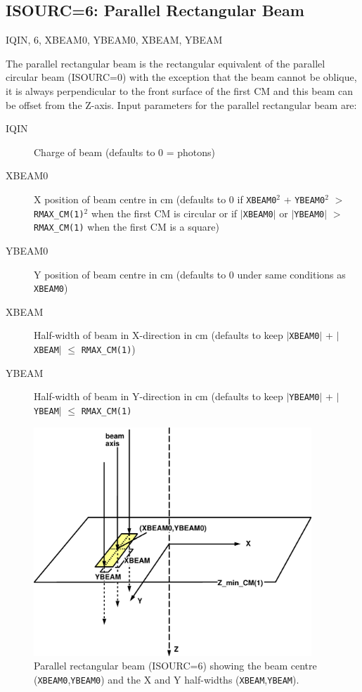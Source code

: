 \documentclass[12pt,twoside]{article}
\newcommand{\cen}[1]{\begin{center} #1 \end{center}                   }
\begin{document}
\clearpage
\subsection{ISOURC=6: Parallel Rectangular Beam}
\cen{IQIN, 6, XBEAM0, YBEAM0, XBEAM, YBEAM}
 
The parallel rectangular beam is the rectangular equivalent of the
parallel circular beam (ISOURC=0) with the exception that the beam
cannot be oblique, it is always perpendicular to
the front surface of the first CM and this beam can be offset from the
Z-axis.
Input parameters for the parallel rectangular beam are:
\begin{description}
\item [IQIN] Charge of beam (defaults to 0 = photons)
\item [XBEAM0] X position of beam centre in cm (defaults to 0 if
\verb+XBEAM0+$^2$ + \verb+YBEAM0+$^2$ $>$ \verb+RMAX_CM(1)+$^2$ when
the first CM is circular
or if $|$\verb+XBEAM0+$|$ or $|$\verb+YBEAM0+$|$ $>$ \verb+RMAX_CM(1)+
 when the first CM is a square)
\item [YBEAM0] Y position of beam centre in cm (defaults to 0 under same
conditions as \verb+XBEAM0+)
\item [XBEAM] Half-width of beam in X-direction in cm (defaults to keep
$|$\verb+XBEAM0+$|$ + $|$\verb+XBEAM+$|$ $\leq$ \verb+RMAX_CM(1)+)

\item [YBEAM] Half-width of beam in Y-direction in cm (defaults to keep
$|$\verb+YBEAM0+$|$ + $|$\verb+YBEAM+$|$ $\leq$ \verb+RMAX_CM(1)+

\end{description}
\begin{figure}[hbp]
\leavevmode
\begin{center}
\mbox{}\hspace{0cm}
\includegraphics[height=8.6cm]{figures/src6}
\caption[ISOURC=6: Parallel rectangular beam.]
{Parallel rectangular beam (ISOURC=6) showing the beam centre
({\tt XBEAM0},{\tt YBEAM0}) and the X and Y half-widths
 ({\tt  XBEAM},{\tt YBEAM}).}
\label{fig_src6}
\end{center}
\end{figure}
\end{document}
